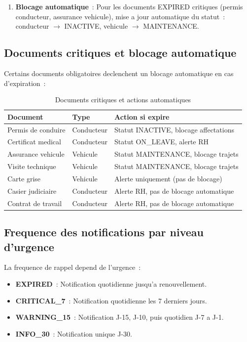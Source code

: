 \documentclass[12pt,a4paper]{report}
\begin{document}
\begin{enumerate}[leftmargin=2cm]
\begin{enumerate}[leftmargin=2cm]
  \item \textbf{Blocage automatique}~: Pour les documents EXPIRED critiques
        (permis conducteur, assurance vehicule), mise a jour automatique
        du statut~: conducteur $\to$ INACTIVE, vehicule $\to$ MAINTENANCE.
\end{enumerate}

\subsection{Documents critiques et blocage automatique}

Certains documents obligatoires declenchent un blocage automatique en cas
d'expiration~:

\begin{table}[H]
\caption{Documents critiques et actions automatiques}
\label{tab:documents_critiques}
\centering\small
\begin{tabularx}{\textwidth}{p{4cm}p{2.5cm}X}
\toprule
\textbf{Document} & \textbf{Type} & \textbf{Action si expire} \\
\midrule
Permis de conduire       & Conducteur & Statut INACTIVE, blocage affectations \\
Certificat medical       & Conducteur & Statut ON\_LEAVE, alerte RH \\
Assurance vehicule       & Vehicule   & Statut MAINTENANCE, blocage trajets \\
Visite technique         & Vehicule   & Statut MAINTENANCE, blocage trajets \\
Carte grise              & Vehicule   & Alerte uniquement (pas de blocage) \\
Casier judiciaire        & Conducteur & Alerte RH, pas de blocage automatique \\
Contrat de travail       & Conducteur & Alerte RH, pas de blocage automatique \\
\bottomrule
\end{tabularx}
\end{table}

\subsection{Frequence des notifications par niveau d'urgence}

La frequence de rappel depend de l'urgence~:

\begin{itemize}[leftmargin=2cm]
  \item \textbf{EXPIRED}~: Notification quotidienne jusqu'a renouvellement.
  \item \textbf{CRITICAL\_7}~: Notification quotidienne les 7 derniers jours.
  \item \textbf{WARNING\_15}~: Notification J-15, J-10, puis quotidien J-7 a J-1.
  \item \textbf{INFO\_30}~: Notification unique J-30.
\end{itemize}


\end{enumerate}
\end{document}
